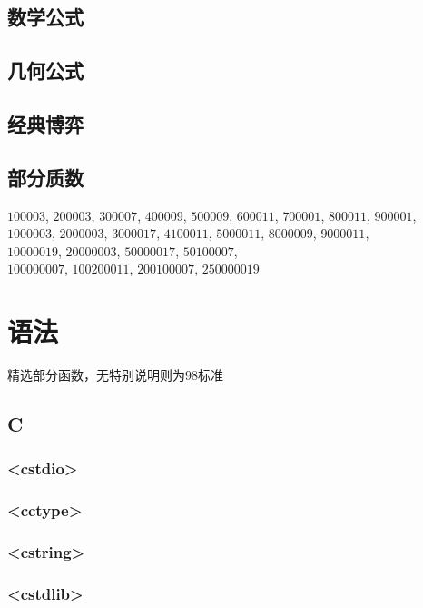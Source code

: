 \documentclass[10pt]{article}
\begin{document}
\subsection{数学公式}


\subsection{几何公式}


\subsection{经典博弈}


\subsection{部分质数}
\noindent
$100003$, $200003$, $300007$, $400009$, $500009$, $600011$, $700001$, $800011$, $900001$, \\
$1000003$, $2000003$, $3000017$, $4100011$, $5000011$, $8000009$, $9000011$, \\
$10000019$, $20000003$, $50000017$, $50100007$, \\
$100000007$, $100200011$, $200100007$, $250000019$
\section{语法}
精选部分函数，无特别说明则为98标准
\subsection{C}
\subsubsection{<cstdio>}

\subsubsection{<cctype>}

\subsubsection{<cstring>}

\subsubsection{<cstdlib>}

\end{document}
